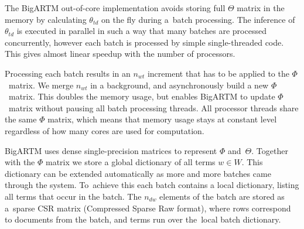 \documentclass[russian,english]{llncs}
\newcommand{\kw}[1]{\textsf{#1}}
\begin{document}
The BigARTM out-of-core implementation avoids storing full $\Theta$ matrix in the memory
by calculating $\theta_{td}$ on the fly during a~batch processing.
The inference of $\theta_{td}$ is executed in parallel in such a way that many batches are processed concurrently,
however each batch is processed by simple single-threaded code.
This 
gives almost linear speedup with the number of processors.

Processing each batch results in an $n_{wt}$ increment that has to be applied to the $\Phi$~matrix.
We merge $n_{wt}$ in a background, and asynchronously build a new $\Phi$~matrix.
This doubles the memory usage, but enables BigARTM to update $\Phi$~matrix without pausing all batch processing threads.
All processor threads share the same $\Phi$ matrix,
which means that memory usage stays at constant level regardless of how many cores are used for computation.


BigARTM uses dense single-precision matrices to represent $\Phi$ and~$\Theta$.
Together with the $\Phi$ matrix we store a global dictionary of all terms ${w \in W}$.
This dictionary can be extended automatically as more and more batches came through the system.
To~achieve this each batch contains a local dictionary, listing all terms that occur in the batch.
The $n_{dw}$ elements of the batch are stored as a~sparse CSR matrix (Compressed Sparse Raw format),
where rows correspond to documents from the batch, and terms run over the~local batch dictionary.
\end{document}
